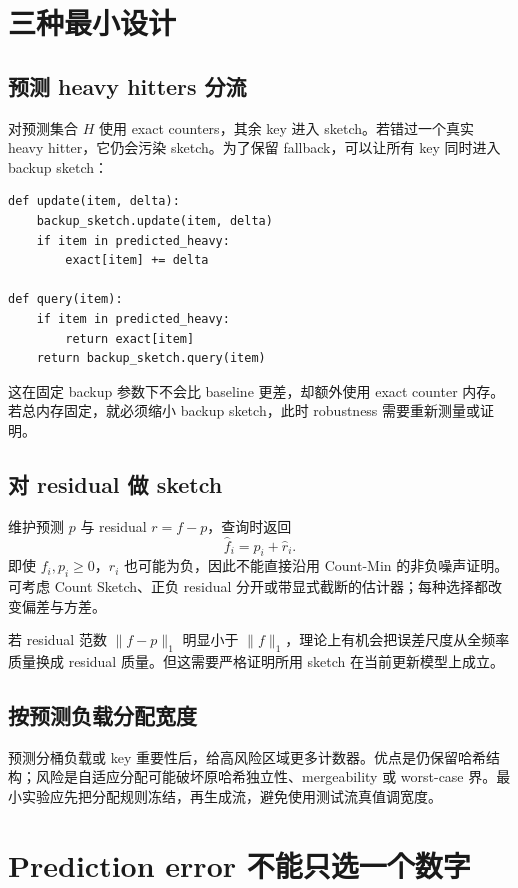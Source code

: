 \section{三种最小设计}

\subsection{预测 heavy hitters 分流}

对预测集合 $H$ 使用 exact counters，其余 key 进入 sketch。若错过一个真实 heavy hitter，它仍会污染 sketch。为了保留 fallback，可以让所有 key 同时进入 backup sketch：
\begin{lstlisting}
def update(item, delta):
    backup_sketch.update(item, delta)
    if item in predicted_heavy:
        exact[item] += delta

def query(item):
    if item in predicted_heavy:
        return exact[item]
    return backup_sketch.query(item)
\end{lstlisting}
这在固定 backup 参数下不会比 baseline 更差，却额外使用 exact counter 内存。若总内存固定，就必须缩小 backup sketch，此时 robustness 需要重新测量或证明。

\subsection{对 residual 做 sketch}

维护预测 $p$ 与 residual $r=f-p$，查询时返回
\[
\widehat f_i=p_i+\widehat r_i.
\]
即使 $f_i,p_i\ge0$，$r_i$ 也可能为负，因此不能直接沿用 Count-Min 的非负噪声证明。可考虑 Count Sketch、正负 residual 分开或带显式截断的估计器；每种选择都改变偏差与方差。

若 residual 范数 $\lVert f-p\rVert_1$ 明显小于 $\lVert f\rVert_1$，理论上有机会把误差尺度从全频率质量换成 residual 质量。但这需要严格证明所用 sketch 在当前更新模型上成立。

\subsection{按预测负载分配宽度}

预测分桶负载或 key 重要性后，给高风险区域更多计数器。优点是仍保留哈希结构；风险是自适应分配可能破坏原哈希独立性、mergeability 或 worst-case 界。最小实验应先把分配规则冻结，再生成流，避免使用测试流真值调宽度。

\section{Prediction error 不能只选一个数字}

